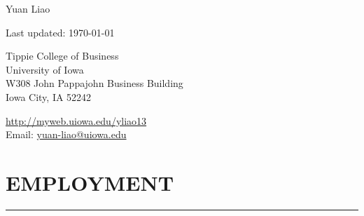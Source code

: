 \documentclass[11pt]{article}
\def\name{Yuan Liao}
\def\footerlink{}
\begin{document}
\begin{center}

 {\huge   Yuan Liao}



\end{center}



\begin{center}
  \begin{footnotesize}
    Last updated: \today \\
    \href{\footerlink}{\texttt{\footerlink}}
  \end{footnotesize}
  \end{center}




\vspace{0.25in}


\begin{minipage}{0.45\linewidth}

Tippie College of Business\\
University  of Iowa\\
W308 John Pappajohn Business Building\\
Iowa City, IA 52242
\end{minipage}
\begin{minipage}{0.45\linewidth}
\href{http://myweb.uiowa.edu/yliao13}{http://myweb.uiowa.edu/yliao13} \\
Email: \href{yuan-liao@uiowa.edu}{yuan-liao@uiowa.edu}
 

\end{minipage}



\section*{EMPLOYMENT}
\hrule

\hfill
\end{document}

